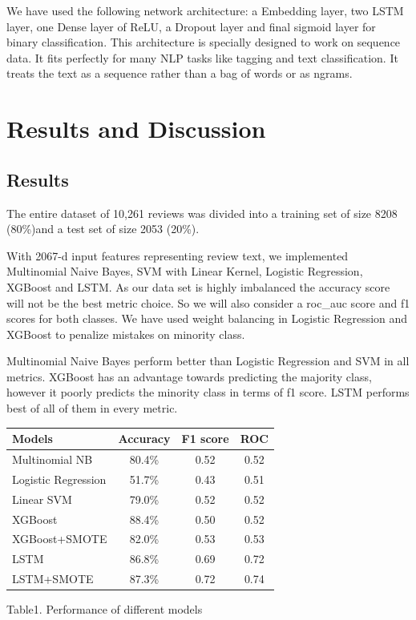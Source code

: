 \documentclass[10pt]{article}
\begin{document}
We have used the following network architecture: a Embedding layer, two LSTM layer, one Dense layer of ReLU, a Dropout layer and final sigmoid layer for binary classification. This architecture is specially designed to work on sequence data. It fits perfectly for many NLP tasks like tagging and text classification. It treats the text as a sequence rather than a bag of words or as ngrams.


\section{Results and Discussion}
\subsection{Results}

The entire dataset of 10,261 reviews was divided into a training set of size 8208 (80\%)and a test set of size 2053 (20\%).

With 2067-d input features representing review text, we implemented Multinomial Naive Bayes, SVM with Linear Kernel, Logistic Regression, XGBoost and LSTM. As our data set is highly imbalanced the accuracy score will not be the best metric choice. So we will also consider a roc\_auc score and f1 scores for both classes. We have used weight balancing in Logistic Regression and XGBoost to penalize mistakes on minority class. 

Multinomial Naive Bayes perform better than Logistic Regression and SVM in all metrics. XGBoost has an advantage towards predicting the majority class, however it poorly predicts the minority class in terms of f1 score. LSTM performs best of all of them in every metric.  


\begin{center}
\begin{tabular}{ l|c|c|c} 
  Models & Accuracy & F1 score & ROC  \\
 \hline
 Multinomial NB & 80.4\% & 0.52 & 0.52  \\ 
 Logistic Regression & 51.7\% & 0.43 & 0.51  \\ 
 Linear SVM & 79.0\% & 0.52 & 0.52 \\ 
 XGBoost & 88.4\% & 0.50 & 0.52 \\ 
 XGBoost+SMOTE & 82.0\% & 0.53 & 0.53 \\ 
 LSTM & 86.8\% & 0.69 & 0.72 \\
 LSTM+SMOTE & 87.3\% & 0.72 & 0.74 \\
 \hline

\end{tabular}
\bigskip
Table1. Performance of different models
\end{center}
\end{document}
